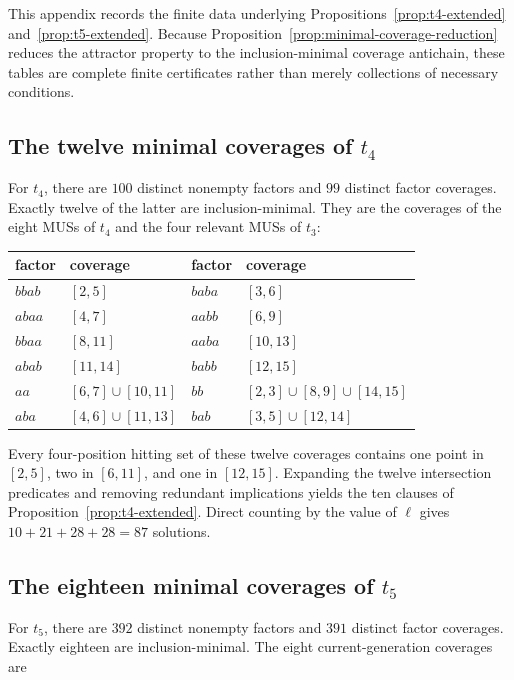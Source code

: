 \documentclass[10pt,a4paper]{article}
\theoremstyle{definition}\newtheorem{definition}[theorem]{Definition}
\theoremstyle{remark}\newtheorem{remark}[theorem]{Remark}
\begin{document}
This appendix records the finite data underlying Propositions~\ref{prop:t4-extended} and~\ref{prop:t5-extended}.  Because Proposition~\ref{prop:minimal-coverage-reduction} reduces the attractor property to the inclusion-minimal coverage antichain, these tables are complete finite certificates rather than merely collections of necessary conditions.

\subsection{The twelve minimal coverages of \texorpdfstring{$t_4$}{t4}}

For $t_4$, there are $100$ distinct nonempty factors and $99$ distinct factor coverages.  Exactly twelve of the latter are inclusion-minimal.  They are the coverages of the eight MUSs of $t_4$ and the four relevant MUSs of $t_3$:

\begin{center}
\begin{tabular}{ll@{\qquad}ll}
\toprule
factor & coverage & factor & coverage\\
\midrule
$bbab$ & $[2,5]$ & $baba$ & $[3,6]$\\
$abaa$ & $[4,7]$ & $aabb$ & $[6,9]$\\
$bbaa$ & $[8,11]$ & $aaba$ & $[10,13]$\\
$abab$ & $[11,14]$ & $babb$ & $[12,15]$\\
$aa$ & $[6,7]\cup[10,11]$ & $bb$ & $[2,3]\cup[8,9]\cup[14,15]$\\
$aba$ & $[4,6]\cup[11,13]$ & $bab$ & $[3,5]\cup[12,14]$\\
\bottomrule
\end{tabular}
\end{center}

Every four-position hitting set of these twelve coverages contains one point in $[2,5]$, two in $[6,11]$, and one in $[12,15]$.  Expanding the twelve intersection predicates and removing redundant implications yields the ten clauses of Proposition~\ref{prop:t4-extended}.  Direct counting by the value of $\ell$ gives $10+21+28+28=87$ solutions.

\subsection{The eighteen minimal coverages of \texorpdfstring{$t_5$}{t5}}

For $t_5$, there are $392$ distinct nonempty factors and $391$ distinct factor coverages.  Exactly eighteen are inclusion-minimal.  The eight current-generation coverages are
\end{document}
